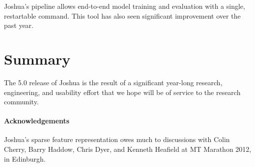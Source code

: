 \documentclass[11pt]{article}
\begin{document}
Joshua's pipeline allows end-to-end model training and evaluation with
a single, restartable command. This tool has also seen significant
improvement over the past year.

\section{Summary}

The 5.0 release of Joshua is the result of a significant year-long
research, engineering, and usability effort that we hope will be of
service to the research community. 

\paragraph{Acknowledgements}

Joshua's sparse feature representation owes much to discussions with
Colin Cherry, Barry Haddow, Chris Dyer, and Kenneth Heafield at MT
Marathon 2012, in Edinburgh.




\end{document}
